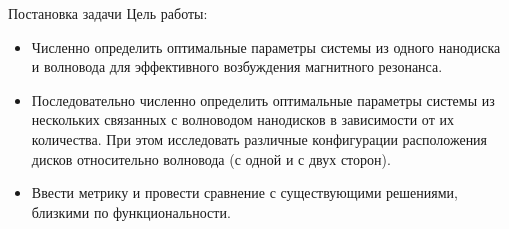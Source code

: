\begin{frame}{Постановка задачи}
	Цель работы:
	
	\begin{itemize}
		\item Численно определить оптимальные параметры системы из одного нанодиска и волновода для эффективного возбуждения магнитного резонанса.
		\item Последовательно численно определить оптимальные параметры системы из нескольких связанных с волноводом нанодисков в зависимости от их количества. При этом исследовать различные конфигурации расположения дисков относительно волновода (с одной и с двух сторон).
		\item Ввести метрику и провести сравнение с существующими решениями, близкими по функциональности.
	\end{itemize}
\end{frame}